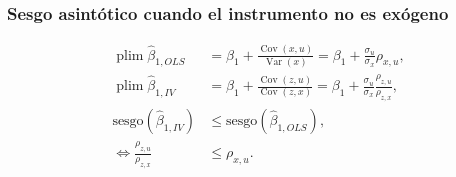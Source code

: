 \documentclass[t, compress, spanish, aspectratio=169]{beamer}
\DeclareMathOperator{\plim}{plim}
\DeclareMathOperator{\Var}{Var}
\DeclareMathOperator{\Cov}{Cov}
\begin{document}
\begin{frame}
    \frametitle{Sesgo asint\'otico cuando el instrumento no es ex\'ogeno}
            \begin{align*}
            \plim \hat \beta_{1,OLS} &= \beta_1+\frac{\Cov(x,u)}{\Var(x)}=\beta_1+\frac{\sigma_u}{\sigma_x}\rho_{x,u},\\
            \plim \hat \beta_{1,IV} &= \beta_1+\frac{\Cov(z,u)}{\Cov(z,x)}=\beta_1+\frac{\sigma_u}{\sigma_x}\frac{\rho_{z,u}}{\rho_{z,x}},\\
            \text{sesgo}(\hat \beta_{1,IV}) &\leq \text{sesgo}(\hat \beta_{1,OLS}),\\
            \iff \frac{\rho_{z,u}}{\rho_{z,x}}& \leq \rho_{x,u}. 
            \end{align*}
\end{frame}

\end{document}
